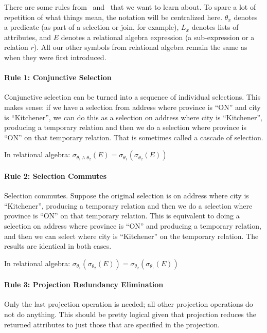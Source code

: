 \documentclass[a4paper]{report}
\begin{document}
There are some rules from~\cite{dsc} and~\cite{fds} that we want to learn about. To spare a lot of repetition of what things mean, the notation will be centralized here. $\theta_{x}$ denotes a predicate (as part of a selection or join, for example), $L_{x}$ denotes lists of attributes, and $E$ denotes a relational algebra expression (a sub-expression or a relation $r$). All our other symbols from relational algebra remain the same as when they were first introduced.

\paragraph{Rule 1: Conjunctive Selection}
Conjunctive selection can be turned into a sequence of individual selections. This makes sense: if we have a selection from address where province is ``ON'' and city is ``Kitchener'', we can do this as a selection on address where city is ``Kitchener'', producing a temporary relation and then we do a selection where province is ``ON'' on that temporary relation. That is sometimes called a cascade of selection.

In relational algebra: $\sigma_{\theta_{1} \wedge \theta_{2}}(E) = \sigma_{\theta_{1}}(\sigma_{\theta_{2}}(E))$


\paragraph{Rule 2: Selection Commutes}
Selection commutes. Suppose the original selection is on address where city is ``Kitchener'', producing a temporary relation and then we do a selection where province is ``ON'' on that temporary relation. This is equivalent to doing a selection on address where province is ``ON'' and producing a temporary relation, and then we can select where city is ``Kitchener'' on the temporary relation. The results are identical in both cases. 

In relational algebra: $\sigma_{\theta_{1}}(\sigma_{\theta_{2}}(E)) = \sigma_{\theta_{2}}(\sigma_{\theta_{1}}(E))$

\paragraph{Rule 3: Projection Redundancy Elimination}

Only the last projection operation is needed; all other projection operations do not do anything. This should be pretty logical given that projection reduces the returned attributes to just those that are specified in the projection.
\end{document}
